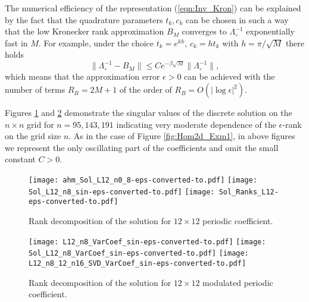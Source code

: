 \documentclass[amstex,amstext,amsfonts,epsf,12pt] {amsart}
\newcommand{\cn}{\color{black}}
\begin{document}
The numerical efficiency of the representation (\ref{eqn:Inv_Kron}) can be explained by 
the fact that
the quadrature parameters $t_k,c_k$ can be chosen in such a way that the low Kronecker
rank approximation ${B}_M$ converges to $\Lambda_\circ^{-1}$ exponentially fast in $M$.
For example, under the choice $t_k=e^{k h}$, $c_k=h t_k$ with $h=\pi /\sqrt{M}$ there holds
\cite{GaHaKh4:02}
\[
 \|\Lambda_\circ^{-1} - {B}_M \| \leq  C e^{- \beta \sqrt{M}}\|\Lambda_\circ^{-1}\|,
\]
which means that the approximation error $\epsilon>0$ can be achieved with the 
number of terms $R_B=2M+1$ of the order of $R_B=O(|\log \epsilon |^2)$.

Figures \ref{fig:Rank_12x12} and \ref{fig:Rank_12x12_mod} demonstrate the singular values 
of the discrete solution on the $n\times n$ grid for $n=95,143, 191$ indicating very moderate
dependence of the $\epsilon$-rank on the grid size $n$. 
As in the case of Figure \ref{fig:Hom2d_Exm1}, in above figures we represent the only oscillating part
of the coefficients and omit the small constant $C>0$.

\begin{figure}[htbp]
\centering
\texttt{[image: ahm\_Sol\_L12\_n0\_8-eps-converted-to.pdf]}
\texttt{[image: Sol\_L12\_n8\_sin-eps-converted-to.pdf]}
\texttt{[image: Sol\_Ranks\_L12-eps-converted-to.pdf]}
 \caption{\small Rank decomposition of the solution for $12\times 12$ periodic coefficient.}
\label{fig:Rank_12x12}  
\end{figure}

\begin{figure}[htbp]
\centering
\texttt{[image: L12\_n8\_VarCoef\_sin-eps-converted-to.pdf]}
\texttt{[image: Sol\_L12\_n8\_VarCoef\_sin-eps-converted-to.pdf]}
\texttt{[image: L12\_n8\_12\_n16\_SVD\_VarCoef\_sin-eps-converted-to.pdf]}
 \caption{\small Rank decomposition of the solution for $12\times 12$ 
 modulated periodic coefficient.}
\label{fig:Rank_12x12_mod}  
\end{figure}
\end{document}
